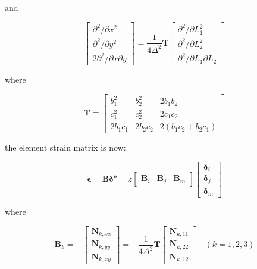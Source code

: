 and 
 
 \begin{equation}\label{key}
 \begin{bmatrix}
 \partial^2 / \partial x^2 \\ 
 \partial^2 / \partial y^2 \\
2 \partial^2 / \partial x \partial y
 \end{bmatrix} = \frac{1}{4\Delta^2} \mathbf{T} \begin{bmatrix}
 \partial^2 / \partial L_1^2 \\ 
 \partial^2 / \partial L_2^2 \\
 \partial^2 / \partial L_1 \partial L_2
 \end{bmatrix} 
 \end{equation}

where

\begin{equation}\label{key}
\mathbf{T} = \begin{bmatrix}
b_1^2 & b_2^2 & 2 b_1 b_2 \\ 
c_1^2 & c_2^2 & 2 c_1 c_2 \\ 
2 b_1 c_1 & 2 b_2 c_2 & 2 ( b_1 c_2 + b_2 c_1)
\end{bmatrix} 
\end{equation}

the element strain matrix is now:

\begin{equation}\label{key}
\mathbf{\epsilon} = \mathbf{B} \mathbf{\delta^e} = z \begin{bmatrix}
\mathbf{B}_i & \mathbf{B}_j & \mathbf{B}_m
\end{bmatrix} \begin{bmatrix}
\mathbf{\delta}_i \\ 
\mathbf{\delta}_j \\ 
\mathbf{\delta}_m
\end{bmatrix} 
\end{equation}

where

\begin{equation}\label{key}
\mathbf{B}_k = -\begin{bmatrix}
\mathbf{N}_{k,xx} \\ 
\mathbf{N}_{k,yy} \\ 
\mathbf{N}_{k,xy}
\end{bmatrix} = - \frac{1}{4 \Delta^2} \mathbf{T} \begin{bmatrix}
\mathbf{N}_{k,11} \\ 
\mathbf{N}_{k,22} \\ 
\mathbf{N}_{k,12}
\end{bmatrix}~~~~ (k=1,2,3)
\end{equation}

